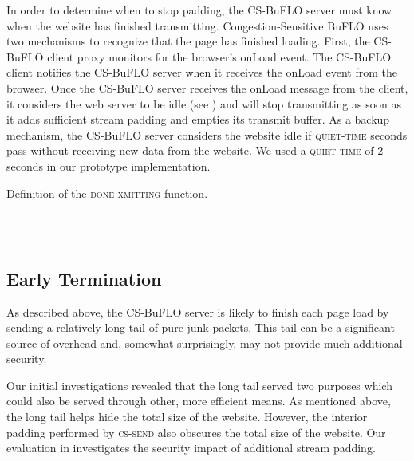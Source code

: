\documentclass[10pt,journal]{IEEEtran}
\newcommand{\quiettime}{{\sc\textsc{quiet-time}}\xspace}
\newcommand{\csbuflo} {Congestion-Sensitive BuFLO\xspace}
\newcommand{\csb} {CS-BuFLO\xspace}
\begin{document}
In order to determine when to stop padding, the \csb server must know
when the website has finished transmitting.  \csbuflo uses two
mechanisms to recognize that the page has finished loading.  First,
the \csb client proxy monitors for the browser's onLoad event.  The
\csb client notifies the \csb server when it receives the onLoad event
from the browser.  Once the \csb server receives the onLoad message
from the client, it considers the web server to be idle (see
) and will stop transmitting as soon as it
adds sufficient stream padding and empties its transmit buffer.  As a
backup mechanism, the \csb server considers the website idle if
\quiettime seconds pass without receiving new data from the website.
We used a \quiettime of 2 seconds in our prototype implementation.





\begin{algorithm}[t]
  \caption{Definition of the \textsc{done-xmitting} function.}
  \label{alg:csbuflo-helpers}
  \begin{algorithmic}
      \State \Return      
    \EndFunction
    \\
      \State\Return 
    \EndFunction
    \\
      \State\Return 
    \EndFunction

  \end{algorithmic}
\end{algorithm}


\subsection{Early Termination}
\label{ssec:early-termination}

As described above, the \csb server is likely to finish each page load
by sending a relatively long tail of pure junk packets.  This tail can
be a significant source of overhead and, somewhat surprisingly, may
not provide much additional security.  

Our initial investigations revealed that the long tail served two
purposes which could also be served through other, more efficient
means.  As mentioned above, the long tail helps hide the total size of
the website.  However, the interior padding performed by
\textsc{cs-send} also obscures the total size of the website.  Our
evaluation in  investigates the security impact of
additional stream padding.
\end{document}
